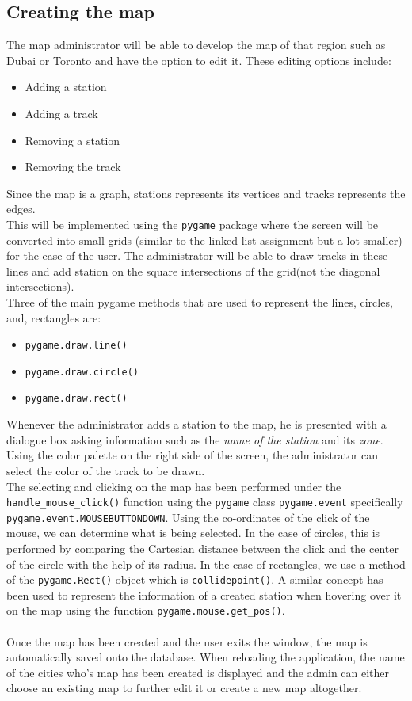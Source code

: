 \documentclass[fontsize=11pt]{article}
\begin{document}
    \subsection*{Creating the map}
    The map administrator will be able to develop the map of that region such as Dubai or Toronto and have the option to edit it.
    These editing options include:
    \begin{itemize}
        \item Adding a station
        \item Adding a track
        \item Removing a station
        \item Removing the track
    \end{itemize}
    Since the map is a graph, stations represents its vertices and tracks represents the edges. \\
    This will be implemented using the \texttt{pygame} package where the screen will be converted into small grids (similar to the linked list assignment but a lot smaller) for the ease of the user. The administrator will be able to draw tracks in these lines and add station on the square intersections of the grid(not the diagonal intersections). \\
    Three of the main pygame methods that are used to represent the lines, circles, and, rectangles are:
    \begin{itemize}
        \item \texttt{pygame.draw.line()}
        \item \texttt{pygame.draw.circle()}
        \item \texttt{pygame.draw.rect()}
    \end{itemize}
    Whenever the administrator adds a station to the map, he is presented with a dialogue box asking information such as the \textit{name of the station} and its \textit{zone}. Using the color palette on the right side of the screen, the administrator can select the color of the track to be drawn.\\
    The selecting and clicking on the map has been performed under the \texttt{handle\_mouse\_click()} function using the \texttt{pygame} class \texttt{pygame.event} specifically \texttt{pygame.event.MOUSEBUTTONDOWN}. Using the co-ordinates of the click of the mouse, we can determine what is being selected. In the case of circles, this is performed by comparing the Cartesian distance between the click and the center of the circle with the help of its radius. In the case of rectangles, we use a method of the \texttt{pygame.Rect()} object which is \texttt{collidepoint()}. A similar concept has been used to represent the information of a created station when hovering over it on the map using the function \texttt{pygame.mouse.get\_pos()}.\\
    \\
    Once the map has been created and the user exits the window, the map is automatically saved onto the database. When reloading the application, the name of the cities who's map has been created is displayed and the admin can either choose an existing map to further edit it or create a new map altogether.
\end{document}
